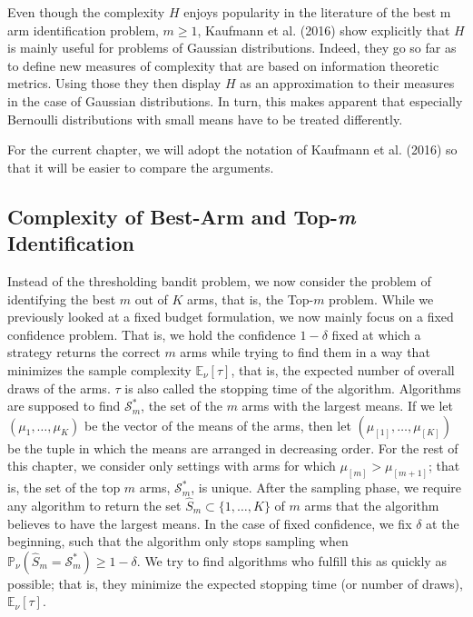 \documentclass[12pt,]{article}
\begin{document}
Even though the complexity \(H\) enjoys popularity in the literature of
the best m arm identification problem, \(m \geq 1\), Kaufmann et al.
(2016) show explicitly that \(H\) is mainly useful for problems of
Gaussian distributions. Indeed, they go so far as to define new measures
of complexity that are based on information theoretic metrics. Using
those they then display \(H\) as an approximation to their measures in
the case of Gaussian distributions. In turn, this makes apparent that
especially Bernoulli distributions with small means have to be treated
differently.

For the current chapter, we will adopt the notation of Kaufmann et al.
(2016) so that it will be easier to compare the arguments.

\subsection{\texorpdfstring{Complexity of Best-Arm and Top-\emph{m}
Identification}{Complexity of Best-Arm and Top-m Identification}}\label{complexity-of-best-arm-and-top-m-identification}

Instead of the thresholding bandit problem, we now consider the problem
of identifying the best \(m\) out of \(K\) arms, that is, the Top-\(m\)
problem. While we previously looked at a fixed budget formulation, we
now mainly focus on a fixed confidence problem. That is, we hold the
confidence \(1-\delta\) fixed at which a strategy returns the correct
\(m\) arms while trying to find them in a way that minimizes the sample
complexity \(\mathbb{E}_{\nu}[\tau]\), that is, the expected number of
overall draws of the arms. \(\tau\) is also called the stopping time of
the algorithm. Algorithms are supposed to find \(\mathcal{S}_m^*\), the
set of the \(m\) arms with the largest means. If we let
\((\mu_1, \dots, \mu_K)\) be the vector of the means of the arms, then
let \((\mu_{[1]}, \dots, \mu_{[K]})\) be the tuple in which the means
are arranged in decreasing order. For the rest of this chapter, we
consider only settings with arms for which \(\mu_{[m]} > \mu_{[m+1]}\);
that is, the set of the top \(m\) arms, \(\mathcal{S}_m^*\), is unique.
After the sampling phase, we require any algorithm to return the set
\(\hat{S}_m \subset \{1,\dots,K\}\) of \(m\) arms that the algorithm
believes to have the largest means. In the case of fixed confidence, we
fix \(\delta\) at the beginning, such that the algorithm only stops
sampling when
\(\mathbb{P}_{\nu}(\hat{S}_m = \mathcal{S}_m^*) \geq 1-\delta\). We try
to find algorithms who fulfill this as quickly as possible; that is,
they minimize the expected stopping time (or number of draws),
\(\mathbb{E}_{\nu}[\tau]\).
\end{document}
